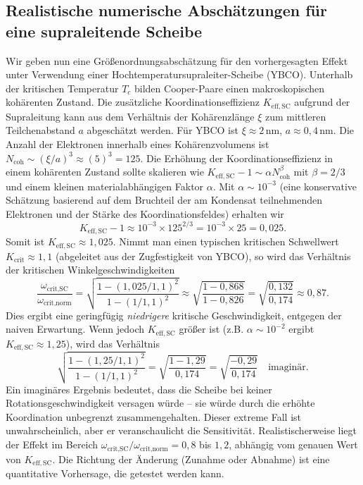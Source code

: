 \documentclass[12pt,a4paper]{article}
\newcommand{\betaf}{\beta}
\begin{document}
	\subsection{Realistische numerische Abschätzungen für eine supraleitende Scheibe}
	\label{subsec:numerical}
	
	Wir geben nun eine Größenordnungsabschätzung für den vorhergesagten Effekt unter Verwendung einer Hochtemperatursupraleiter-Scheibe (YBCO). Unterhalb der kritischen Temperatur \(T_c\) bilden Cooper-Paare einen makroskopischen kohärenten Zustand. Die zusätzliche Koordinationseffizienz \(K_{\mathrm{eff,SC}}\) aufgrund der Supraleitung kann aus dem Verhältnis der Kohärenzlänge \(\xi\) zum mittleren Teilchenabstand \(a\) abgeschätzt werden. Für YBCO ist \(\xi \approx 2\,\text{nm}\), \(a \approx 0,4\,\text{nm}\). Die Anzahl der Elektronen innerhalb eines Kohärenzvolumens ist \(N_{\text{coh}} \sim (\xi/a)^3 \approx (5)^3 = 125\). Die Erhöhung der Koordinationseffizienz in einem kohärenten Zustand sollte skalieren wie \(K_{\mathrm{eff,SC}} - 1 \sim \alpha N_{\text{coh}}^{\betaf}\) mit \(\betaf = 2/3\) und einem kleinen materialabhängigen Faktor \(\alpha\). Mit \(\alpha \sim 10^{-3}\) (eine konservative Schätzung basierend auf dem Bruchteil der am Kondensat teilnehmenden Elektronen und der Stärke des Koordinationsfeldes) erhalten wir
	\[
	K_{\mathrm{eff,SC}} - 1 \approx 10^{-3} \times 125^{2/3} = 10^{-3} \times 25 = 0,025.
	\]
	Somit ist \(K_{\mathrm{eff,SC}} \approx 1,025\). Nimmt man einen typischen kritischen Schwellwert \(K_{\mathrm{crit}} \approx 1,1\) (abgeleitet aus der Zugfestigkeit von YBCO), so wird das Verhältnis der kritischen Winkelgeschwindigkeiten
	\[
	\frac{\omega_{\text{crit,SC}}}{\omega_{\text{crit,norm}}} = \sqrt{ \frac{1 - (1,025/1,1)^2}{1 - (1/1,1)^2} } \approx \sqrt{ \frac{1 - 0,868}{1 - 0,826} } = \sqrt{ \frac{0,132}{0,174} } \approx 0,87.
	\]
	Dies ergibt eine geringfügig \textit{niedrigere} kritische Geschwindigkeit, entgegen der naiven Erwartung. Wenn jedoch \(K_{\mathrm{eff,SC}}\) größer ist (z.B. \(\alpha \sim 10^{-2}\) ergibt \(K_{\mathrm{eff,SC}} \approx 1,25\)), wird das Verhältnis
	\[
	\sqrt{ \frac{1 - (1,25/1,1)^2}{1 - (1/1,1)^2} } = \sqrt{ \frac{1 - 1,29}{0,174} } = \sqrt{ \frac{-0,29}{0,174} } \quad \text{imaginär}.
	\]
	Ein imaginäres Ergebnis bedeutet, dass die Scheibe bei keiner Rotationsgeschwindigkeit versagen würde – sie würde durch die erhöhte Koordination unbegrenzt zusammengehalten. Dieser extreme Fall ist unwahrscheinlich, aber er veranschaulicht die Sensitivität. Realistischerweise liegt der Effekt im Bereich \(\omega_{\text{crit,SC}}/\omega_{\text{crit,norm}} = 0,8\) bis \(1,2\), abhängig vom genauen Wert von \(K_{\mathrm{eff,SC}}\). Die Richtung der Änderung (Zunahme oder Abnahme) ist eine quantitative Vorhersage, die getestet werden kann.
	
\end{document}
